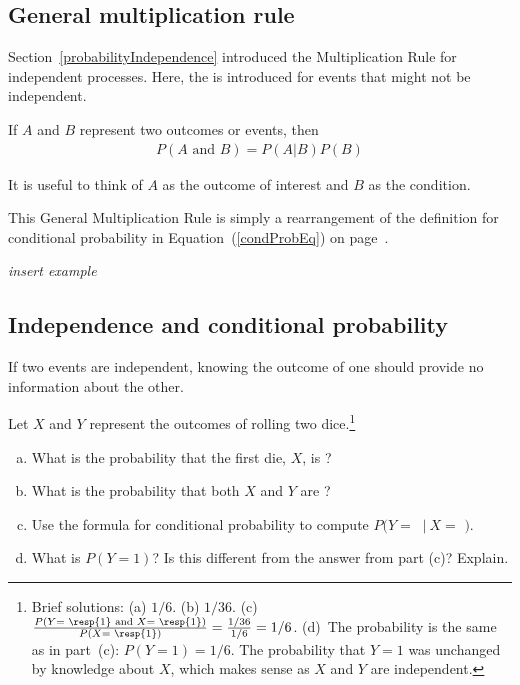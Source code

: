 \newpage
\subsection{General multiplication rule}

Section~\ref{probabilityIndependence} introduced the Multiplication Rule for independent processes. Here, the  is introduced for events that might not be independent.

\begin{termBox}{
If $A$ and $B$ represent two outcomes or events, then \vspace{-1.5mm}
\begin{eqnarray*}
P(A\text{ and }B) = P(A | B) P(B)
\end{eqnarray*} \vspace{-6.5mm} \par
It is useful to think of $A$ as the outcome of interest and $B$ as the condition.}
\end{termBox}
This General Multiplication Rule is simply a rearrangement of the definition for conditional probability in Equation~(\ref{condProbEq}) on page~\pageref{condProbEq}.


\textit{insert example}


\subsection{Independence and conditional probability}

If two events are independent, knowing the outcome of one should provide no information about the other.  
\begin{exercise} \label{condProbOfRollingA1AfterOne1}
Let $X$ and $Y$ represent the outcomes of rolling two dice.\footnote{Brief solutions: (a) $1/6$. (b) $1/36$. (c)~$\frac{P(Y = \text{ \resp{1} and }X=\text{ \resp{1}})}{P(X=\text{ \resp{1}})} = \frac{1/36}{1/6} = 1/6$. (d)~The probability is the same as in part~(c): $P(Y=1)=1/6$. The probability that $Y=1$ was unchanged by knowledge about $X$, which makes sense as $X$ and $Y$ are independent.}
\begin{enumerate}[(a)]
\item What is the probability that the first die, $X$, is ?
\item What is the probability that both $X$ and $Y$ are ?
\item Use the formula for conditional probability to compute $P(Y =$ $\ |\ X = $ $)$.
\item What is $P(Y=1)$? Is this different from the answer from part (c)? Explain.
\end{enumerate}
\end{exercise}

